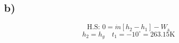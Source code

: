

\subsection*{b)}
\[
\text{H.S: } 0 = \dot{m} [h_2 - h_1] - W_{\text{a}}
\]
\[
h_2 = h_g \quad t_1 = -10^\circ = 263.15 \text{K}
\]